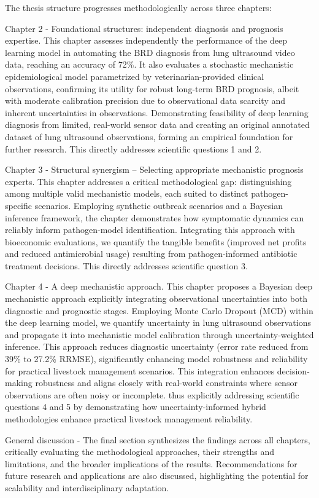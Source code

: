 The thesis structure progresses methodologically across three chapters:

Chapter 2 - Foundational structures: independent diagnosis and prognosis expertise. 
This chapter assesses independently the performance of the deep learning model in automating the BRD diagnosis from lung ultrasound video data, reaching an accuracy of 72\%. It also evaluates a stochastic mechanistic epidemiological model parametrized by veterinarian-provided clinical observations, confirming its utility for robust long-term BRD prognosis, albeit with moderate calibration precision due to observational data scarcity and inherent uncertainties in observations. Demonstrating feasibility of deep learning diagnosis from limited, real-world sensor data and creating an original annotated dataset of lung ultrasound observations, forming an empirical foundation for further research. This directly addresses scientific questions 1 and 2.

Chapter 3 - Structural synergism – Selecting appropriate mechanistic prognosis experts. This chapter addresses a critical methodological gap: distinguishing among multiple valid mechanistic models, each suited to distinct pathogen-specific scenarios. Employing synthetic outbreak scenarios and a Bayesian inference framework, the chapter demonstrates how symptomatic dynamics can reliably inform pathogen-model identification. Integrating this approach with bioeconomic evaluations, we quantify the tangible benefits (improved net profits and reduced antimicrobial usage) resulting from pathogen-informed antibiotic treatment decisions. This directly addresses scientific question 3.

Chapter 4 - A deep mechanistic approach.  This chapter proposes a Bayesian deep mechanistic approach explicitly integrating observational uncertainties into both diagnostic and prognostic stages. Employing Monte Carlo Dropout (MCD) within the deep learning model, we quantify uncertainty in lung ultrasound observations and propagate it into mechanistic model calibration through uncertainty-weighted inference. This approach reduces diagnostic uncertainty (error rate reduced from 39\% to 27.2\% RRMSE), significantly enhancing model robustness and reliability for practical livestock management scenarios. This integration enhances decision-making robustness and aligns closely with real-world constraints where sensor observations are often noisy or incomplete. thus explicitly addressing scientific questions 4 and 5 by demonstrating how uncertainty-informed hybrid methodologies enhance practical livestock management reliability.

General discussion - The final section synthesizes the findings across all chapters, critically evaluating the methodological approaches, their strengths and limitations, and the broader implications of the results. Recommendations for future research and applications are also discussed, highlighting the potential for scalability and interdisciplinary adaptation.
